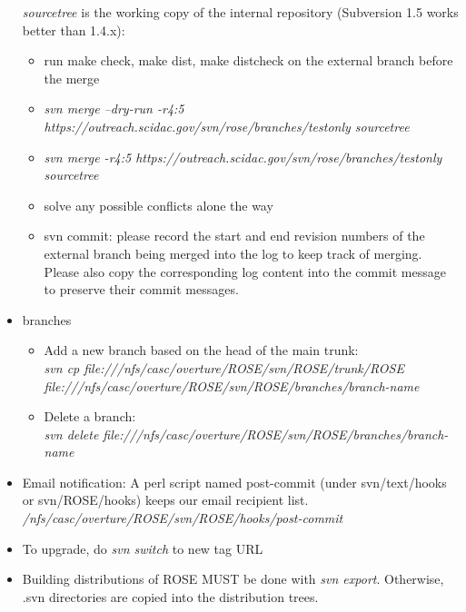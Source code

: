 \begin{itemize}
\textit{sourcetree} is the working copy of the internal repository (Subversion 1.5 works better than 1.4.x):
  \begin{itemize}
          \item run make check, make dist, make distcheck on the external branch before the merge
          \item \textit{svn merge --dry-run -r4:5
          https://outreach.scidac.gov/svn/rose/branches/testonly
          sourcetree} 
          \item \textit{svn merge -r4:5
          https://outreach.scidac.gov/svn/rose/branches/testonly
          sourcetree}
          \item solve any possible conflicts alone the way
           \item svn commit: please record the start and end revision numbers of
         the external branch being merged into the log to keep track of merging. 
         Please also copy the corresponding log content into the
         commit message to preserve their commit messages.
   \end{itemize}

\item branches   
    \begin{itemize}
    \item Add a new branch based on the head of the main trunk:\\
    \textit{svn cp file:///nfs/casc/overture/ROSE/svn/ROSE/trunk/ROSE file:///nfs/casc/overture/ROSE/svn/ROSE/branches/branch-name}
    \item Delete a branch: \\
    \textit{svn delete file:///nfs/casc/overture/ROSE/svn/ROSE/branches/branch-name}
    \end{itemize}

\item Email notification: A perl script named post-commit (under
svn/text/hooks or svn/ROSE/hooks) keeps our email recipient list.\\
          \textit{/nfs/casc/overture/ROSE/svn/ROSE/hooks/post-commit}
\item To upgrade, do \textit{svn switch} to new tag URL
\item Building distributions of ROSE MUST be done with \textit{svn export}. Otherwise, .svn directories are copied into the distribution trees. 

\end{itemize}

